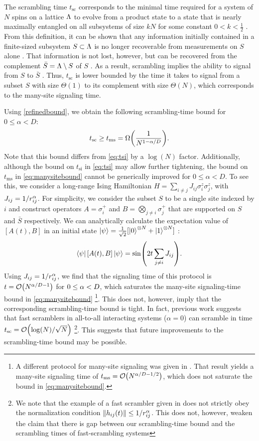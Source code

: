 The scrambling time $t_\text{sc}$  corresponds to the minimal time required for a system of $N$ spins on a lattice $\Lambda$ to evolve from a product state to a state that is nearly maximally entangled on all subsystems of size $kN$ for some constant $0<k<\frac12$ \cite{Lashkari13}.
From this definition, it can be shown that any information initially contained in a finite-sized subsystem $S \subset \Lambda$ is no longer recoverable from measurements on $S$ alone \cite{Lashkari13}.
That information is not lost, however, but can be recovered from the complement $\bar{S} = \Lambda \setminus S$ of $S$ \cite{Hayden07,Cotler18}.
As a result, scrambling implies the ability to signal from $S$ to $\bar{S}$ \cite{Lashkari13}.
Thus, $t_\text{sc}$ is lower bounded by the time it takes to signal from a subset $S$ with size $\Theta(1)$ to its complement with size $\Theta(N)$, which corresponds to the many-site signaling time.

Using \cref{refinedbound}, we obtain the following scrambling-time bound for $0\le\alpha<D$:
\begin{equation}
    \label{eq:manysitebound}
    t_\text{sc}\ge t_\text{ms}= \W{ \frac{1}{N^{1-\al/D}}}.
\end{equation}
Note that this bound differs from \cref{eq:tsi} by a $\log(N)$ factor.
Additionally, although the bound on $t_\text{si}$ in \cref{eq:tsi} may allow further tightening, the bound on $t_\text{ms}$ in \cref{eq:manysitebound} cannot be generically improved for $0\le\alpha<D$.
To see this, we consider a long-range Ising Hamiltonian $H=\sum_{i\neq j}J_{ij}\sigma_{i}^{z}\sigma_{j}^{z}$, with $J_{ij}=1/r_{ij}^{\alpha}$.
For simplicity, we consider the subset $S$ to be a single site indexed by $i$ and construct operators $A=\sigma_{i}^{+}$ and $B=\bigotimes_{j\ne i}\sigma_{j}^{+}$ that are supported on $S$ and $\bar{S}$ respectively.
We can analytically calculate the expectation value of $[A(t),B]$ in an initial state $\left | \psi \right\rangle=\frac{1}{\sqrt{2}}[\left | 0 \right\rangle^{\otimes N}+\left | 1 \right\rangle^{\otimes N}]$ \cite{Gong17}:
\begin{equation}
    \label{eq:manysiteprotocol}
\left \langle \psi \right |[A(t),B]\left | \psi \right\rangle=\sin(2t\sum_{j\ne i}J_{ij}).
\end{equation}
Using $J_{ij}=1/r_{ij}^{\alpha}$, we find that the signaling time of this protocol is $t=\O{N^{\al/D-1}}$ for $0\le\alpha<D$, which saturates the many-site signaling-time bound in \cref{eq:manysitebound} \footnote{A different protocol for many-site signaling was given in \cite{Eisert13}. That result yields a many-site signaling time of $t_\text{ms} =\O{N^{\al/D-1/2}}$, which does not saturate the bound in \cref{eq:manysitebound}.}.
This does not, however, imply that the corresponding scrambling-time bound is tight.
In fact, previous work suggests that fast scramblers in all-to-all interacting systems ($\alpha=0$) can scramble in time $t_\text{sc}=\O{\log(N)/\sqrt{N}}$ \cite{Lashkari13}
\footnote{We note that the example of a fast scrambler given in \cite{Lashkari13} does not strictly obey the normalization condition $\left\|h_{ij}(t)\right\|\le 1/r_{ij}^{\alpha}$. This does not, however,
 weaken the claim that there is gap between our scrambling-time bound and the scrambling times of fast-scrambling systems}.
This suggests that future improvements to the scrambling-time bound may be possible.


